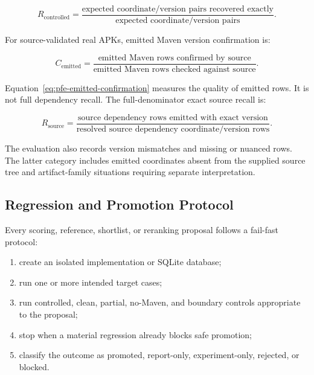 \begin{equation}
R_{\mathrm{controlled}} =
\frac{\text{expected coordinate/version pairs recovered exactly}}
{\text{expected coordinate/version pairs}}.
\end{equation}

For source-validated real APKs, emitted Maven version confirmation is:

\begin{equation}
C_{\mathrm{emitted}} =
\frac{\text{emitted Maven rows confirmed by source}}
{\text{emitted Maven rows checked against source}}.
\label{eq:pfe-emitted-confirmation}
\end{equation}

Equation~\ref{eq:pfe-emitted-confirmation} measures the quality of emitted
rows. It is not full dependency recall. The full-denominator exact source
recall is:

\begin{equation}
R_{\mathrm{source}} =
\frac{\text{source dependency rows emitted with exact version}}
{\text{resolved source dependency coordinate/version rows}}.
\label{eq:pfe-source-recall}
\end{equation}

The evaluation also records version mismatches and missing or nuanced rows.
The latter category includes emitted coordinates absent from the supplied
source tree and artifact-family situations requiring separate interpretation.

\subsection{Regression and Promotion Protocol}

Every scoring, reference, shortlist, or reranking proposal follows a fail-fast
protocol:

\begin{enumerate}
  \item create an isolated implementation or SQLite database;
  \item run one or more intended target cases;
  \item run controlled, clean, partial, no-Maven, and boundary controls
  appropriate to the proposal;
  \item stop when a material regression already blocks safe promotion;
  \item classify the outcome as promoted, report-only, experiment-only,
  rejected, or blocked.
\end{enumerate}

